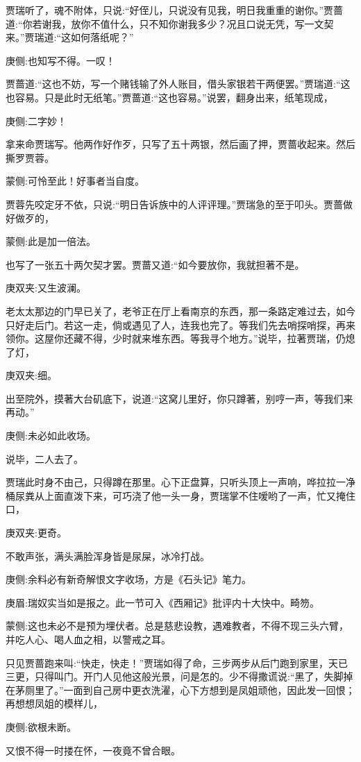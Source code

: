 \begin{parag}
    贾瑞听了，魂不附体，只说:“好侄儿，只说没有见我，明日我重重的谢你。”贾蔷道:“你若谢我，放你不值什么，只不知你谢我多少？况且口说无凭，写一文契来。”贾瑞道:“这如何落纸呢？”\begin{note}庚侧:也知写不得。一叹！\end{note}贾蔷道:“这也不妨，写一个赌钱输了外人账目，借头家银若干两便罢。”贾瑞道:“这也容易。只是此时无纸笔。”贾蔷道:“这也容易。”说罢，翻身出来，纸笔现成，\begin{note}庚侧:二字妙！\end{note}拿来命贾瑞写。他两作好作歹，只写了五十两银，然后画了押，贾蔷收起来。然后撕罗贾蓉。\begin{note}蒙侧:可怜至此！好事者当自度。\end{note}贾蓉先咬定牙不依，只说:“明日告诉族中的人评评理。”贾瑞急的至于叩头。贾蔷做好做歹的，\begin{note}蒙侧:此是加一倍法。\end{note}也写了一张五十两欠契才罢。贾蔷又道:“如今要放你，我就担著不是。\begin{note}庚双夹:又生波澜。\end{note}老太太那边的门早已关了，老爷正在厅上看南京的东西，那一条路定难过去，如今只好走后门。若这一走，倘或遇见了人，连我也完了。等我们先去哨探哨探，再来领你。这屋你还藏不得，少时就来堆东西。等我寻个地方。”说毕，拉著贾瑞，仍熄了灯，\begin{note}庚双夹:细。\end{note}出至院外，摸著大台矶底下，说道:“这窝儿里好，你只蹲著，别哼一声，等我们来再动。”\begin{note}庚侧:未必如此收场。\end{note}说毕，二人去了。
\end{parag}


\begin{parag}
    贾瑞此时身不由己，只得蹲在那里。心下正盘算，只听头顶上一声响，哗拉拉一净桶尿粪从上面直泼下来，可巧浇了他一头一身，贾瑞掌不住嗳哟了一声，忙又掩住口，\begin{note}庚双夹:更奇。\end{note}不敢声张，满头满脸浑身皆是尿屎，冰冷打战。\begin{note}庚侧:余料必有新奇解恨文字收场，方是《石头记》笔力。\end{note}\begin{note}庚眉:瑞奴实当如是报之。此一节可入《西厢记》批评内十大快中。畸笏。\end{note}\begin{note}蒙侧:这也未必不是预为埋伏者。总是慈悲设教，遇难教者，不得不现三头六臂，并吃人心、喝人血之相，以警戒之耳。\end{note}只见贾蔷跑来叫:“快走，快走！”贾瑞如得了命，三步两步从后门跑到家里，天已三更，只得叫门。开门人见他这般光景，问是怎的。少不得撒谎说:“黑了，失脚掉在茅厕里了。”一面到自己房中更衣洗濯，心下方想到是凤姐顽他，因此发一回恨；再想想凤姐的模样儿，\begin{note}庚侧:欲根未断。\end{note}又恨不得一时搂在怀，一夜竟不曾合眼。
\end{parag}


